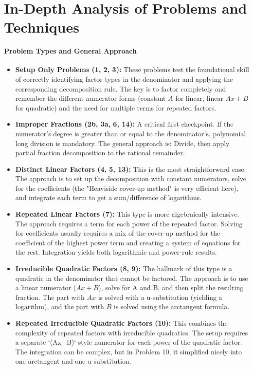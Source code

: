 \documentclass{article}
\begin{document}
\part{In-Depth Analysis of Problems and Techniques}
\subsection{Problem Types and General Approach}
\begin{itemize}
    \item \textbf{Setup Only Problems (1, 2, 3):} These problems test the foundational skill of correctly identifying factor types in the denominator and applying the corresponding decomposition rule. The key is to factor completely and remember the different numerator forms (constant $A$ for linear, linear $Ax+B$ for quadratic) and the need for multiple terms for repeated factors.
    \item \textbf{Improper Fractions (2b, 3a, 6, 14):} A critical first checkpoint. If the numerator's degree is greater than or equal to the denominator's, polynomial long division is mandatory. The general approach is: Divide, then apply partial fraction decomposition to the rational remainder.
    \item \textbf{Distinct Linear Factors (4, 5, 13):} This is the most straightforward case. The approach is to set up the decomposition with constant numerators, solve for the coefficients (the "Heaviside cover-up method" is very efficient here), and integrate each term to get a sum/difference of logarithms.
    \item \textbf{Repeated Linear Factors (7):} This type is more algebraically intensive. The approach requires a term for each power of the repeated factor. Solving for coefficients usually requires a mix of the cover-up method for the coefficient of the highest power term and creating a system of equations for the rest. Integration yields both logarithmic and power-rule results.
    \item \textbf{Irreducible Quadratic Factors (8, 9):} The hallmark of this type is a quadratic in the denominator that cannot be factored. The approach is to use a linear numerator ($Ax+B$), solve for A and B, and then split the resulting fraction. The part with $Ax$ is solved with a u-substitution (yielding a logarithm), and the part with $B$ is solved using the arctangent formula.
    \item \textbf{Repeated Irreducible Quadratic Factors (10):} This combines the complexity of repeated factors with irreducible quadratics. The setup requires a separate `(Ax+B)`-style numerator for each power of the quadratic factor. The integration can be complex, but in Problem 10, it simplified nicely into one arctangent and one u-substitution.

\end{itemize}
\end{document}
